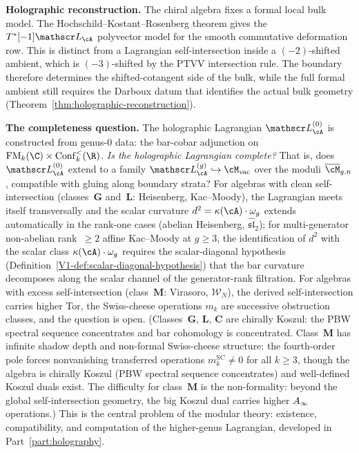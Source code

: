 \medskip\noindent\textbf{Holographic reconstruction.}\enspace
The chiral algebra fixes a formal local bulk model. The
Hochschild--Kostant--Rosenberg theorem gives the
$T^*[-1]\cL_\cA$ polyvector model for the smooth commutative
deformation row.  This is distinct from a Lagrangian self-intersection
inside a $(-2)$-shifted ambient, which is $(-3)$-shifted by the PTVV
intersection rule.  The boundary therefore determines the
shifted-cotangent side of the bulk, while the full formal ambient
still requires the Darboux datum that identifies the actual bulk
geometry (Theorem~\ref{thm:holographic-reconstruction}).

\medskip\noindent\textbf{The completeness question.}\enspace
The holographic Lagrangian $\cL_\cA^{(0)}$ is constructed from genus-$0$ data: the bar-cobar adjunction on $\FM_k(\C) \times \Conf_k^<(\R)$. \emph{Is the holographic Lagrangian complete?} That is, does $\cL_\cA^{(0)}$ extend to a family $\cL_\cA^{(g)} \hookrightarrow \cM_{\mathrm{vac}}$ over the moduli $\overline{\cM}_{g,n}$, compatible with gluing along boundary strata? For algebras with clean self-intersection (classes~$\mathbf{G}$ and~$\mathbf{L}$: Heisenberg, Kac--Moody), the Lagrangian meets itself transversally and the scalar curvature $d^2 = \kappa(\cA) \cdot \omega_g$ extends automatically in the rank-one cases (abelian Heisenberg, $\widehat{\mathfrak{sl}}_2$); for multi-generator non-abelian rank~$\ge 2$ affine Kac--Moody at $g \ge 3$, the identification of $d^2$ with the scalar class $\kappa(\cA)\cdot \omega_g$ requires the scalar-diagonal hypothesis (Definition~\ref{V1-def:scalar-diagonal-hypothesis}) that the bar curvature decomposes along the scalar channel of the generator-rank filtration. For algebras with excess self-intersection (class~$\mathbf{M}$: Virasoro, $\mathcal{W}_N$), the derived self-intersection carries higher Tor, the Swiss-cheese operations $m_k$ are successive obstruction classes, and the question is open. (Classes~$\mathbf{G}$, $\mathbf{L}$, $\mathbf{C}$ are chirally Koszul: the PBW spectral sequence concentrates and bar cohomology is concentrated. Class~$\mathbf{M}$ has infinite shadow depth and non-formal Swiss-cheese structure: the fourth-order pole forces nonvanishing transferred operations $m_k^{\mathrm{SC}} \neq 0$ for all $k \geq 3$, though the algebra is chirally Koszul (PBW spectral sequence concentrates) and well-defined Koszul duals exist. The difficulty for class~$\mathbf{M}$ is the non-formality: beyond the global self-intersection geometry, the big Koszul dual carries higher $A_\infty$ operations.) This is the central problem of the modular theory: existence, compatibility, and computation of the higher-genus Lagrangian, developed in Part~\ref{part:holography}.

